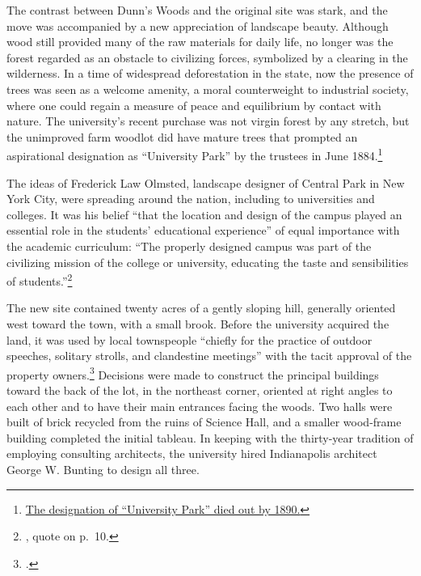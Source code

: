 \documentclass[
  american,
  letterpaper,
]{scrreprt}
\begin{document}
The contrast between Dunn's Woods and the original site was stark, and
the move was accompanied by a new appreciation of landscape beauty.
Although wood still provided many of the raw materials for daily life,
no longer was the forest regarded as an obstacle to civilizing forces,
symbolized by a clearing in the wilderness. In a time of widespread
deforestation in the state, now the presence of trees was seen as a
welcome amenity, a moral counterweight to industrial society, where one
could regain a measure of peace and equilibrium by contact with nature.
The university's recent purchase was not virgin forest by any stretch,
but the unimproved farm woodlot did have mature trees that prompted an
aspirational designation as ``University Park'' by the trustees in June
1884.\footnote{\href{https://purl.dlib.indiana.edu/iudl/archives/iubot/1884-06-04}{The
  designation of ``University Park'' died out by 1890.}}

The ideas of Frederick Law Olmsted, landscape designer of Central Park
in New York City, were spreading around the nation, including to
universities and colleges. It was his belief ``that the location and
design of the campus played an essential role in the students'
educational experience'' of equal importance with the academic
curriculum: ``The properly designed campus was part of the civilizing
mission of the college or university, educating the taste and
sensibilities of students.''\footnote{, quote on p.~10.}

The new site contained twenty acres of a gently sloping hill, generally
oriented west toward the town, with a small brook. Before the university
acquired the land, it was used by local townspeople ``chiefly for the
practice of outdoor speeches, solitary strolls, and clandestine
meetings'' with the tacit approval of the property owners.\footnote{.} Decisions were made to construct the principal
buildings toward the back of the lot, in the northeast corner, oriented
at right angles to each other and to have their main entrances facing
the woods. Two halls were built of brick recycled from the ruins of
Science Hall, and a smaller wood-frame building completed the initial
tableau. In keeping with the thirty-year tradition of employing
consulting architects, the university hired Indianapolis architect
George W. Bunting to design all three.
\end{document}
